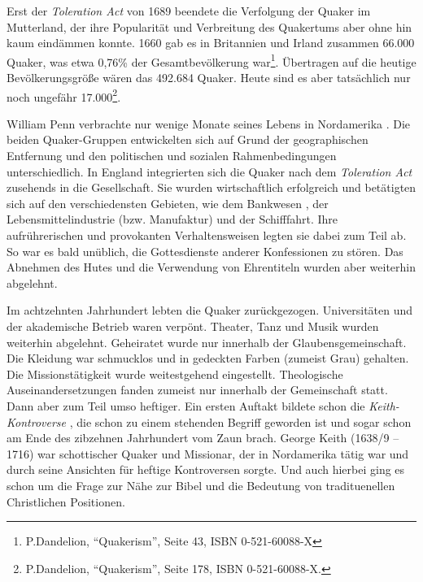 \medskip

Erst der \textit{Toleration Act}  von 1689 beendete die
Verfolgung der Quaker im
Mutterland, der ihre Popularität und Verbreitung des Quakertums aber ohne hin kaum eindämmen konnte.
  1660 gab
es in Britannien  und Irland 
zusammen
66.000 Quaker, was etwa 0,76\% der
Gesamtbevölkerung war\footnote{P.Dandelion, "`Quakerism"', Seite 43, ISBN
0-521-60088-X}. Übertragen auf die heutige Bevölkerungsgröße wären das 492.684
Quaker. Heute sind es aber tatsächlich nur noch ungefähr
17.000\footnote{P.Dandelion, "`Quakerism"', Seite 178, ISBN 0-521-60088-X.}.

\medskip

William Penn verbrachte nur wenige Monate seines Lebens in Nordamerika
. Die beiden
Quaker-Gruppen entwickelten sich auf Grund der geographischen Entfernung und den
politischen und sozialen Rahmenbedingungen unterschiedlich. In
England integrierten sich die Quaker nach dem \textit{Toleration Act} zusehends
in die Gesellschaft. Sie wurden  wirtschaftlich
erfolgreich und betätigten sich
auf den verschiedensten Gebieten, wie dem Bankwesen , der
Lebensmittelindustrie 
(bzw. Manufaktur) und der Schifffahrt. Ihre aufrührerischen und provokanten
Verhaltensweisen legten sie dabei zum Teil ab. So war es bald unüblich, die
Gottesdienste  anderer Konfessionen
 zu stören. Das Abnehmen des Hutes und die
Verwendung von Ehrentiteln wurden aber weiterhin abgelehnt.

\medskip

Im achtzehnten Jahrhundert lebten die Quaker zurückgezogen.
Universitäten  und der akademische Betrieb waren verpönt.
 Theater, Tanz  und Musik 
wurden weiterhin abgelehnt. Geheiratet  wurde nur innerhalb der
Glaubensgemeinschaft. Die Kleidung  war schmucklos und in
gedeckten Farben
(zumeist Grau) gehalten. Die Missionstätigkeit wurde weitestgehend eingestellt.
Theologische Auseinandersetzungen fanden zumeist nur innerhalb der Gemeinschaft
statt. Dann aber zum Teil umso heftiger. Ein ersten Auftakt bildete schon die
\textit{Keith-Kontroverse} , die schon zu einem
stehenden Begriff geworden ist und sogar schon am Ende des zibzehnen Jahrhundert vom Zaun brach. George Keith (1638/9 -- 1716)  war schottischer
Quaker und Missionar, der in
Nordamerika tätig war und durch seine Ansichten für heftige Kontroversen
sorgte. Und auch hierbei ging es schon um die Frage zur Nähe zur Bibel und die Bedeutung von tradituenellen Christlichen Positionen.


